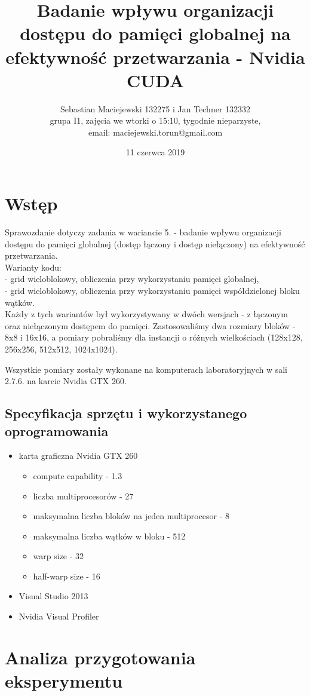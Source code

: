 \documentclass[10pt,a4paper]{article}
\author{Sebastian Maciejewski 132275 i Jan Techner 132332\\
grupa I1, zajęcia we wtorki o 15:10, tygodnie nieparzyste,\\
email: maciejewski.torun@gmail.com}
\title{Badanie wpływu organizacji dostępu do pamięci globalnej na efektywność
przetwarzania - Nvidia CUDA}
\date{11 czerwca 2019}
\begin{document}
\maketitle
\section{Wstęp}
Sprawozdanie dotyczy zadania w wariancie 5. - badanie wpływu organizacji dostępu do
pamięci globalnej (dostęp łączony i dostęp niełączony) na efektywność przetwarzania.\\
Warianty kodu:\\
- grid wieloblokowy, obliczenia przy wykorzystaniu pamięci globalnej,\\
- grid wieloblokowy, obliczenia przy wykorzystaniu pamięci współdzielonej bloku wątków.\\
Każdy z tych wariantów był wykorzystywany w dwóch wersjach - z łączonym oraz niełączonym
dostępem do pamięci. Zastosowaliśmy dwa rozmiary bloków - 8x8 i 16x16, a pomiary pobraliśmy
dla instancji o różnych wielkościach (128x128, 256x256, 512x512, 1024x1024).

Wszystkie pomiary zostały wykonane na komputerach laboratoryjnych w sali 2.7.6. na karcie
Nvidia GTX 260.

\subsection{Specyfikacja sprzętu i wykorzystanego oprogramowania}
\begin{itemize}
	\item karta graficzna Nvidia GTX 260
	      \begin{itemize}
		      \item compute capability - 1.3
		      \item liczba multiprocesorów - 27
		      \item maksymalna liczba bloków na jeden multiprocesor - 8
		      \item maksymalna liczba wątków w bloku - 512
		      \item warp size - 32
		      \item half-warp size - 16
	      \end{itemize}
	\item Visual Studio 2013
	\item Nvidia Visual Profiler
\end{itemize}

\section{Analiza przygotowania eksperymentu}
\end{document}
